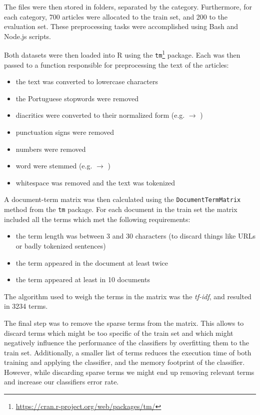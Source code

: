 \documentclass[conference]{IEEEtran}
\begin{document}
The files were then stored in folders, separated by the category.
Furthermore, for each category, 700 articles were allocated to the
train set, and 200 to the evaluation set. These preprocessing tasks
were accomplished using Bash and Node.js scripts.

Both datasets were then loaded into R using the
\texttt{tm}\footnote{\url{https://cran.r-project.org/web/packages/tm/}}
package. Each was then passed to a function responsible for
preprocessing the text of the articles:

\begin{itemize}
    \item the text was converted to lowercase characters
    \item the Portuguese stopwords were removed
    \item diacritics were converted to their normalized form (e.g.
         $\rightarrow$ )
    \item punctuation signs were removed
    \item numbers were removed
    \item word were stemmed (e.g.  $\rightarrow$
        )
    \item whitespace was removed and the text was tokenized
\end{itemize}

A document-term matrix was then calculated using the
\texttt{DocumentTermMatrix} method from the \texttt{tm} package. 
For each document in the train set the matrix included all the
terms which met the following requirements:

\begin{itemize}
    \item the term length was between 3 and 30 characters (to discard
        things like URLs or badly tokenized sentences)
    \item the term appeared in the document at least twice
    \item the term appeared at least in 10 documents
\end{itemize}
The algorithm used to weigh the terms in the matrix was the
\textit{tf-idf}, and resulted in 3234 terms.


The final step was to remove the sparse terms from the matrix.
This allows to discard terms which might be too specific of the train
set and which might negatively influence the performance of the
classifiers by overfitting them to the train set. Additionally, a
smaller list of terms reduces the execution time of both training and
applying the classifier, and the memory footprint of the classifier.
However, while discarding sparse terms we might end up removing
relevant terms and increase our classifiers error rate.
\end{document}
